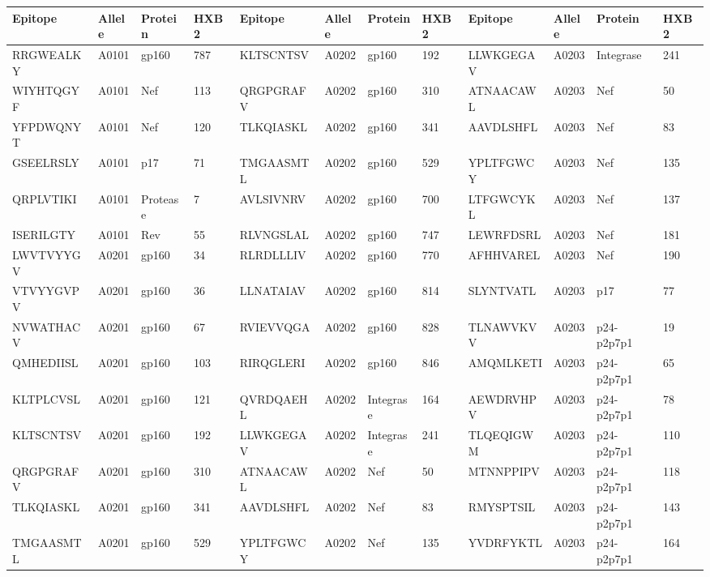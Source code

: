 \begin{table}[htp]
\begin{center}
\begin{sideways}
{
\tiny
\begin{tabulary}{1.5\textwidth}{|l|l|l|l|l|l|l|l|l|l|l|l|}
\hline
Epitope & Allele & Protein & HXB2 & Epitope & Allele & Protein & HXB2 & Epitope & Allele & Protein & HXB2 \bigstrut \\
\hline
RRGWEALKY & A0101 & gp160 & 787 & KLTSCNTSV & A0202 & gp160 & 192 & LLWKGEGAV & A0203 & Integrase & 241 \bigstrut[t] \\
WIYHTQGYF & A0101 & Nef & 113 & QRGPGRAFV & A0202 & gp160 & 310 & ATNAACAWL & A0203 & Nef & 50 \\
YFPDWQNYT & A0101 & Nef & 120 & TLKQIASKL & A0202 & gp160 & 341 & AAVDLSHFL & A0203 & Nef & 83 \\
GSEELRSLY & A0101 & p17 & 71 & TMGAASMTL & A0202 & gp160 & 529 & YPLTFGWCY & A0203 & Nef & 135 \\
QRPLVTIKI & A0101 & Protease & 7 & AVLSIVNRV & A0202 & gp160 & 700 & LTFGWCYKL & A0203 & Nef & 137 \\
ISERILGTY & A0101 & Rev & 55 & RLVNGSLAL & A0202 & gp160 & 747 & LEWRFDSRL & A0203 & Nef & 181 \\
LWVTVYYGV & A0201 & gp160 & 34 & RLRDLLLIV & A0202 & gp160 & 770 & AFHHVAREL & A0203 & Nef & 190 \\
VTVYYGVPV & A0201 & gp160 & 36 & LLNATAIAV & A0202 & gp160 & 814 & SLYNTVATL & A0203 & p17 & 77 \\
NVWATHACV & A0201 & gp160 & 67 & RVIEVVQGA & A0202 & gp160 & 828 & TLNAWVKVV & A0203 & p24-p2p7p1 & 19 \\
QMHEDIISL & A0201 & gp160 & 103 & RIRQGLERI & A0202 & gp160 & 846 & AMQMLKETI & A0203 & p24-p2p7p1 & 65 \\
KLTPLCVSL & A0201 & gp160 & 121 & QVRDQAEHL & A0202 & Integrase & 164 & AEWDRVHPV & A0203 & p24-p2p7p1 & 78 \\
KLTSCNTSV & A0201 & gp160 & 192 & LLWKGEGAV & A0202 & Integrase & 241 & TLQEQIGWM & A0203 & p24-p2p7p1 & 110 \\
QRGPGRAFV & A0201 & gp160 & 310 & ATNAACAWL & A0202 & Nef & 50 & MTNNPPIPV & A0203 & p24-p2p7p1 & 118 \\
TLKQIASKL & A0201 & gp160 & 341 & AAVDLSHFL & A0202 & Nef & 83 & RMYSPTSIL & A0203 & p24-p2p7p1 & 143 \\
TMGAASMTL & A0201 & gp160 & 529 & YPLTFGWCY & A0202 & Nef & 135 & YVDRFYKTL & A0203 & p24-p2p7p1 & 164 \\

\end{tabulary}}
\end{sideways}
\end{center}
\end{table}
